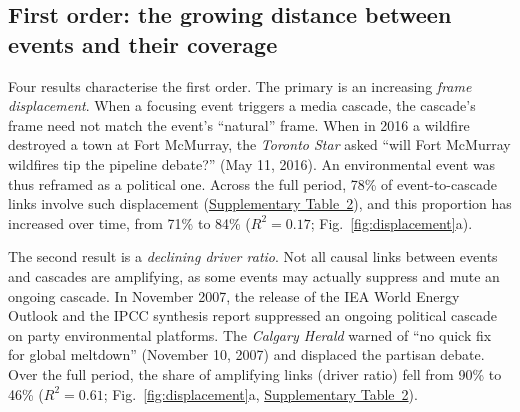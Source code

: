 \documentclass[11pt]{article}
\begin{document}
\subsection*{First order: the growing distance between events and their coverage}

Four results characterise the first order. The primary is an increasing \emph{frame displacement}. When a focusing event triggers a media cascade, the cascade's frame need not match the event's ``natural'' frame. When in 2016 a wildfire destroyed a town at Fort McMurray, the \textit{Toronto Star} asked ``will Fort McMurray wildfires tip the pipeline debate?'' (May 11, 2016). An environmental event was thus reframed as a political one. Across the full period, 78\% of event-to-cascade links involve such displacement (\hyperref[tab:si_displacement]{Supplementary Table~2}), and this proportion has increased over time, from 71\% to 84\% ($R^2 = 0.17$; Fig.~\ref{fig:displacement}a). 

The second result is a  \emph{declining driver ratio}. Not all causal links between events and cascades are amplifying, as some events may actually suppress and mute an ongoing cascade. In November 2007, the release of the IEA World Energy Outlook and the IPCC synthesis report suppressed an ongoing political cascade on party environmental platforms. The \textit{Calgary Herald} warned of ``no quick fix for global meltdown'' (November 10, 2007) and displaced the partisan debate. Over the full period, the share of amplifying links (driver ratio) fell from 90\% to 46\% ($R^2 = 0.61$; Fig.~\ref{fig:displacement}a, \hyperref[tab:si_displacement]{Supplementary Table~2}). 
\end{document}
